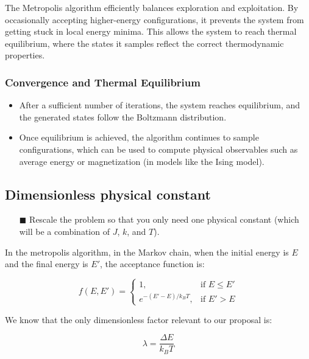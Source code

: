 \documentclass[11pt]{article}
\begin{document}
The Metropolis algorithm efficiently balances exploration and exploitation. By occasionally accepting higher-energy configurations, it prevents the system from getting stuck in local energy minima. This allows the system to reach thermal equilibrium, where the states it samples reflect the correct thermodynamic properties.

\subsubsection*{Convergence and Thermal Equilibrium}

\begin{itemize}
    \item After a sufficient number of iterations, the system reaches equilibrium, and the generated states follow the Boltzmann distribution.
    \item Once equilibrium is achieved, the algorithm continues to sample configurations, which can be used to compute physical observables such as average energy or magnetization (in models like the Ising model).
\end{itemize}



%
%


\subsection*{Dimensionless physical constant}

\begin{itemize}
    \item[$\blacksquare$] Rescale the problem so that you only need one physical constant (which will be a combination of $J$, $k$, and $T$).
\end{itemize}

In the metropolis algorithm, in the Markov chain, when the initial energy is $E$ and the final energy is $E'$, the acceptance function is:


$$
f(E,E') = 
\begin{cases}
1,  & \text{if $E\leq E'$} \\
e^{-(E'-E)/k_BT}, & \text{if $E'>E$}
\end{cases}
$$

We know that the only dimensionless factor relevant to our proposal is:

\begin{equation}
    \lambda = \frac{\Delta E}{k_BT}
\end{equation}
\end{document}
